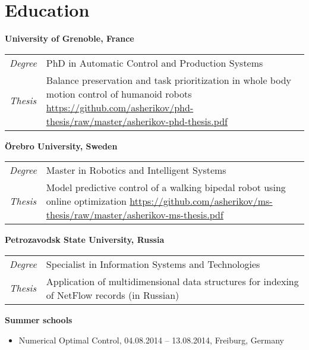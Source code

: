 \documentclass[a4paper,10pt]{report}
\begin{document}
\section{Education}
\begin{adjustwidth}{0.5cm}{0pt}
    {\bf {} University of Grenoble, France}\\
    \begin{tabularx}{\linewidth}{l X}
        {\it Degree}    & PhD in Automatic Control and Production Systems\\
        {\it Thesis}    &   Balance preservation and task prioritization in whole
                            body motion control of humanoid robots
                            \href{https://github.com/asherikov/phd-thesis/raw/master/asherikov-phd-thesis.pdf}
                            {https://github.com/asherikov/phd-thesis/raw/master/asherikov-phd-thesis.pdf}\\
    \end{tabularx}

    \vspace{0.2cm}

    {\bf {} \"Orebro University, Sweden}\\
    \begin{tabularx}{\linewidth}{l X}
        {\it Degree}    & Master in Robotics and Intelligent Systems\\
        {\it Thesis}    &   Model predictive control of a walking bipedal robot
                            using online optimization
                            \href{https://github.com/asherikov/ms-thesis/raw/master/asherikov-ms-thesis.pdf}
                            {https://github.com/asherikov/ms-thesis/raw/master/asherikov-ms-thesis.pdf}\\
    \end{tabularx}

    \vspace{0.2cm}

    {\bf {} Petrozavodsk State University, Russia}\\
    \begin{tabularx}{\linewidth}{l X}
        {\it Degree}    & Specialist in Information Systems and Technologies\\
        {\it Thesis}    &   Application of multidimensional data structures
                            for indexing of NetFlow records (in Russian)\\
    \end{tabularx}

    \vspace{0.2cm}


\pagebreak
    {\bf Summer schools}
    \begin{itemize}
        \item Numerical Optimal Control, 04.08.2014 -- 13.08.2014, Freiburg, Germany
    \end{itemize}
\end{adjustwidth}
\end{document}
